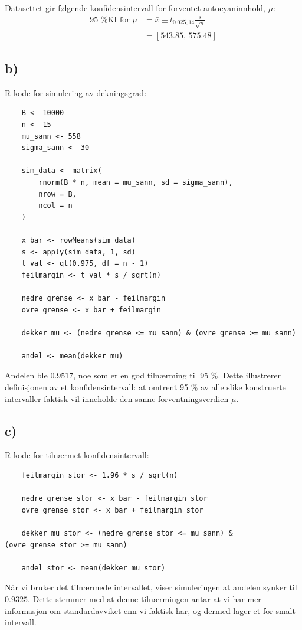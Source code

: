 \documentclass[11pt, a4paper]{article}
\begin{document}
Datasettet gir følgende konfidensintervall for forventet antocyaninnhold, $\mu$:
\begin{align*}
    \text{95 \% KI for } \mu &= \bar{x} \pm t_{0.025, 14} \frac{s}{\sqrt{n}} \\
    &= [543.85, \, 575.48]
\end{align*}

\subsection*{b)}

R-kode for simulering av dekningsgrad: 
\begin{verbatim}
    B <- 10000
    n <- 15
    mu_sann <- 558
    sigma_sann <- 30

    sim_data <- matrix(
        rnorm(B * n, mean = mu_sann, sd = sigma_sann), 
        nrow = B, 
        ncol = n
    )

    x_bar <- rowMeans(sim_data)
    s <- apply(sim_data, 1, sd)
    t_val <- qt(0.975, df = n - 1)
    feilmargin <- t_val * s / sqrt(n)

    nedre_grense <- x_bar - feilmargin
    ovre_grense <- x_bar + feilmargin

    dekker_mu <- (nedre_grense <= mu_sann) & (ovre_grense >= mu_sann)

    andel <- mean(dekker_mu)
\end{verbatim}

Andelen ble $0.9517$, noe som er en god tilnærming til 95 \%. Dette illustrerer definisjonen av et konfidensintervall: at omtrent 95 \% av alle slike konstruerte intervaller faktisk vil inneholde den sanne forventningsverdien $\mu$.


\subsection*{c)}
R-kode for tilnærmet konfidensintervall:
\begin{verbatim}
    feilmargin_stor <- 1.96 * s / sqrt(n)

    nedre_grense_stor <- x_bar - feilmargin_stor
    ovre_grense_stor <- x_bar + feilmargin_stor

    dekker_mu_stor <- (nedre_grense_stor <= mu_sann) & (ovre_grense_stor >= mu_sann)

    andel_stor <- mean(dekker_mu_stor)
\end{verbatim}

Når vi bruker det tilnærmede intervallet, viser simuleringen at andelen synker til $0.9325$. Dette stemmer med at denne tilnærmingen antar at vi har mer informasjon om standardavviket enn vi faktisk har, og dermed lager et for smalt intervall.
\end{document}

